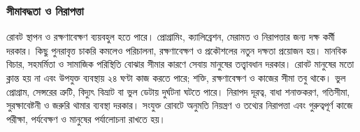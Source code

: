 \subsubsection{সীমাবদ্ধতা ও নিরাপত্তা}
রোবট স্থাপন ও রক্ষণাবেক্ষণ ব্যয়বহুল হতে পারে। প্রোগ্রামিং, ক্যালিব্রেশন, মেরামত ও নিরাপত্তার জন্য দক্ষ কর্মী দরকার। কিছু পুনরাবৃত্ত চাকরি কমলেও পরিচালনা, রক্ষণাবেক্ষণ ও প্রকৌশলের নতুন দক্ষতা প্রয়োজন হয়। মানবিক বিচার, সহমর্মিতা ও সামাজিক পরিস্থিতি বোঝার সীমার কারণে সেবায় মানুষের তত্ত্বাবধান দরকার।
রোবট মানুষের মতো ক্লান্ত হয় না এবং উপযুক্ত ব্যবস্থায় ২৪ ঘণ্টা কাজ করতে পারে; শক্তি, রক্ষণাবেক্ষণ ও কাজের সীমা তবু থাকে। ভুল প্রোগ্রাম, সেন্সরের ত্রুটি, বিদ্যুৎ বিভ্রাট বা ভুল ডেটায় দুর্ঘটনা ঘটতে পারে। নিরাপদ দূরত্ব, বাধা শনাক্তকরণ, গতিসীমা, সুরক্ষাবেষ্টনী ও জরুরি থামার ব্যবস্থা দরকার। সংযুক্ত রোবটে অনুমতি নিয়ন্ত্রণ ও তথ্যের নিরাপত্তা এবং গুরুত্বপূর্ণ কাজে পরীক্ষা, পর্যবেক্ষণ ও মানুষের পর্যালোচনা রাখতে হয়।
